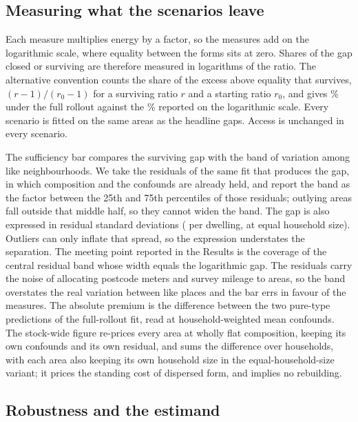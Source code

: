 \documentclass[pdflatex,sn-nature]{sn-jnl}
\begin{document}
\subsection*{Measuring what the scenarios leave}

Each measure multiplies energy by a factor, so the measures add on the logarithmic scale, where equality between the forms sits at zero. Shares of the gap closed or surviving are therefore measured in logarithms of the ratio. The alternative convention counts the share of the excess above equality that survives, $(r-1)/(r_{0}-1)$ for a surviving ratio $r$ and a starting ratio $r_{0}$, and gives \nepifullSurvivesExcess\% under the full rollout against the \nepifullSurvives\% reported on the logarithmic scale. Every scenario is fitted on the same \nepisampleN{} areas as the headline gaps. Access is unchanged in every scenario.

The sufficiency bar compares the surviving gap with the band of variation among like neighbourhoods. We take the residuals of the same fit that produces the gap, in which composition and the confounds are already held, and report the band as the factor between the 25th and 75th percentiles of those residuals; outlying areas fall outside that middle half, so they cannot widen the band. The gap is also expressed in residual standard deviations (\nepifullGapSd{} per dwelling, \nepifullFamGapSd{} at equal household size). Outliers can only inflate that spread, so the expression understates the separation. The meeting point reported in the Results is the coverage of the central residual band whose width equals the logarithmic gap. The residuals carry the noise of allocating postcode meters and survey mileage to areas, so the band overstates the real variation between like places and the bar errs in favour of the measures. The absolute premium is the difference between the two pure-type predictions of the full-rollout fit, read at household-weighted mean confounds. The stock-wide figure re-prices every area at wholly flat composition, keeping its own confounds and its own residual, and sums the difference over households, with each area also keeping its own household size in the equal-household-size variant; it prices the standing cost of dispersed form, and implies no rebuilding.

\subsection*{Robustness and the estimand}
\end{document}
